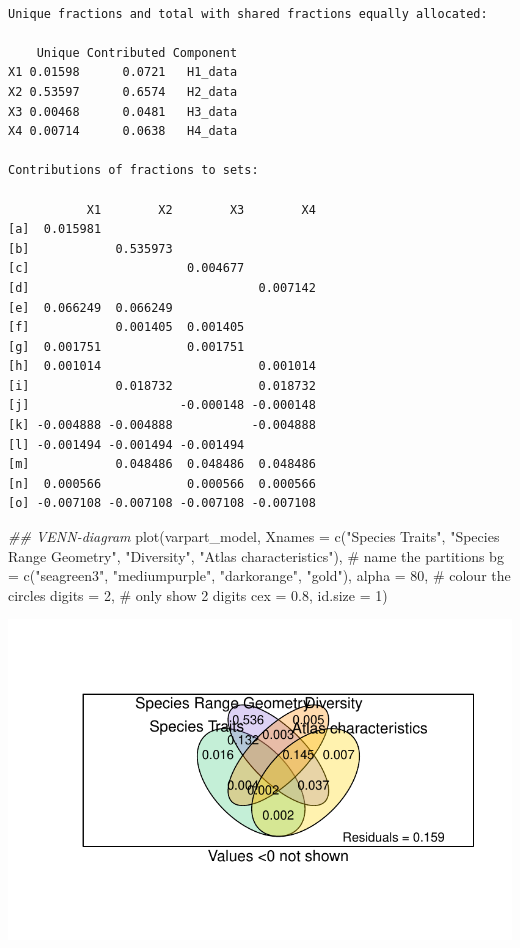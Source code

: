 \documentclass[
  letterpaper,
  DIV=11,
  numbers=noendperiod]{scrartcl}
\newenvironment{Shaded}{\begin{snugshade}}{\end{snugshade}}
\newcommand{\AttributeTok}[1]{\textcolor[rgb]{0.40,0.45,0.13}{#1}}
\newcommand{\CommentTok}[1]{\textcolor[rgb]{0.37,0.37,0.37}{#1}}
\newcommand{\DecValTok}[1]{\textcolor[rgb]{0.68,0.00,0.00}{#1}}
\newcommand{\DocumentationTok}[1]{\textcolor[rgb]{0.37,0.37,0.37}{\textit{#1}}}
\newcommand{\FloatTok}[1]{\textcolor[rgb]{0.68,0.00,0.00}{#1}}
\newcommand{\FunctionTok}[1]{\textcolor[rgb]{0.28,0.35,0.67}{#1}}
\newcommand{\NormalTok}[1]{\textcolor[rgb]{0.00,0.23,0.31}{#1}}
\newcommand{\StringTok}[1]{\textcolor[rgb]{0.13,0.47,0.30}{#1}}
\begin{document}
\begin{verbatim}

Unique fractions and total with shared fractions equally allocated:

    Unique Contributed Component
X1 0.01598      0.0721   H1_data
X2 0.53597      0.6574   H2_data
X3 0.00468      0.0481   H3_data
X4 0.00714      0.0638   H4_data

Contributions of fractions to sets:

           X1        X2        X3        X4
[a]  0.015981                              
[b]            0.535973                    
[c]                      0.004677          
[d]                                0.007142
[e]  0.066249  0.066249                    
[f]            0.001405  0.001405          
[g]  0.001751            0.001751          
[h]  0.001014                      0.001014
[i]            0.018732            0.018732
[j]                     -0.000148 -0.000148
[k] -0.004888 -0.004888           -0.004888
[l] -0.001494 -0.001494 -0.001494          
[m]            0.048486  0.048486  0.048486
[n]  0.000566            0.000566  0.000566
[o] -0.007108 -0.007108 -0.007108 -0.007108
\end{verbatim}

\begin{Shaded}
\begin{Highlighting}[]
\DocumentationTok{\#\# VENN{-}diagram}
\FunctionTok{plot}\NormalTok{(varpart\_model,}
     \AttributeTok{Xnames =} \FunctionTok{c}\NormalTok{(}\StringTok{"Species Traits"}\NormalTok{, }\StringTok{"Species Range Geometry"}\NormalTok{, }\StringTok{"Diversity"}\NormalTok{, }\StringTok{"Atlas characteristics"}\NormalTok{), }\CommentTok{\# name the partitions}
     \AttributeTok{bg =} \FunctionTok{c}\NormalTok{(}\StringTok{"seagreen3"}\NormalTok{, }\StringTok{"mediumpurple"}\NormalTok{, }\StringTok{"darkorange"}\NormalTok{, }\StringTok{"gold"}\NormalTok{), }\AttributeTok{alpha =} \DecValTok{80}\NormalTok{, }\CommentTok{\# colour the circles}
     \AttributeTok{digits =} \DecValTok{2}\NormalTok{, }\CommentTok{\# only show 2 digits}
     \AttributeTok{cex =} \FloatTok{0.8}\NormalTok{,}
     \AttributeTok{id.size =} \DecValTok{1}\NormalTok{)}
\end{Highlighting}
\end{Shaded}

\includegraphics{MachineLearning_StaticPatterNN_Report_files/figure-pdf/var-part-vegan-1.pdf}
\end{document}
